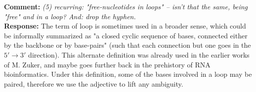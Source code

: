 \documentclass[11pt,hyperref,draft]{article} %
\newcommand{\Answer}[1]{\noindent\textsf{\textbf{Response: }}{\sf#1}\\}
\newcommand{\Comment}[1]{\noindent\textsf{\textbf{Comment: }}{\it#1}\\[.5em]}
\begin{document}
\Comment{(5) recurring: "free-nucleotides in loops" -- isn't that the same, being "free" and in a loop? And: drop the hyphen.}
\Answer{The term of loop is sometimes used in a broader sense, which could be informally summarized as "a closed cyclic sequence of bases, connected either by the backbone or by base-pairs" (such that each connection but one goes in the $5'\to3'$ direction). This alternate definition was already used in the earlier works of M. Zuker, and maybe goes further back in the prehistory of RNA bioinformatics. Under this definition,  some of the bases involved in a loop may be paired, therefore we use the adjective to lift any ambiguity.
}




\end{document}

